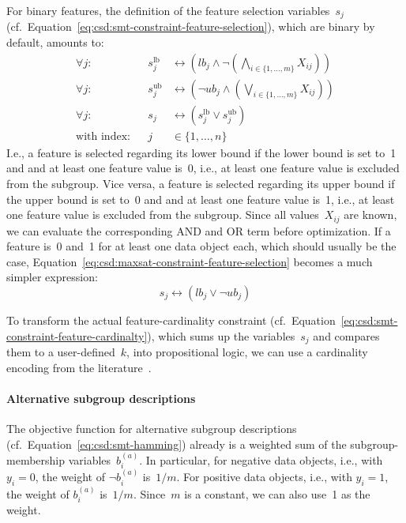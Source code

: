 \documentclass{article}
\theoremstyle{definition}
\begin{document}
For binary features, the definition of the feature selection variables~$s_j$ (cf.~Equation~\ref{eq:csd:smt-constraint-feature-selection}), which are binary by default, amounts to:
%
\begin{equation}
	\begin{aligned}
		\forall j: & & s^{\text{lb}}_j &\leftrightarrow \left( \mathit{lb}_j \land \lnot \left( \bigwedge_{i \in \{1, \dots, m\}} X_{ij} \right) \right) \\
		\forall j: & &s^{\text{ub}}_j &\leftrightarrow \left( \lnot \mathit{ub}_j \land \left( \bigvee_{i \in \{1, \dots, m\}} X_{ij} \right) \right) \\
		\forall j: & & s_j &\leftrightarrow \left( s^{\text{lb}}_j \lor s^{\text{ub}}_j \right) \\
		\text{with index:} & & j &\in \{1, \dots, n\}
	\end{aligned}
	\label{eq:csd:maxsat-constraint-feature-selection}
\end{equation}
%
I.e., a feature is selected regarding its lower bound if the lower bound is set to~1 and and at least one feature value is~0, i.e., at least one feature value is excluded from the subgroup.
Vice versa, a feature is selected regarding its upper bound if the upper bound is set to~0 and and at least one feature value is~1, i.e., at least one feature value is excluded from the subgroup.
Since all values~$X_{ij}$ are known, we can evaluate the corresponding AND and OR term before optimization.
If a feature is~0 and~1 for at least one data object each, which should usually be the case, Equation~\ref{eq:csd:maxsat-constraint-feature-selection} becomes a much simpler expression:
%
\begin{equation}
		s_j \leftrightarrow \left( \mathit{lb}_j\lor \lnot \mathit{ub}_j \right)
	\label{eq:csd:maxsat-constraint-feature-selections-simplified}
\end{equation}
%

To transform the actual feature-cardinality constraint (cf.~Equation~\ref{eq:csd:smt-constraint-feature-cardinalty}), which sums up the variables~$s_j$ and compares them to a user-defined~$k$, into propositional logic, we can use a cardinality encoding from the literature~\cite{sinz2005towards}.

\paragraph{Alternative subgroup descriptions}

The objective function for alternative subgroup descriptions (cf.~Equation~\ref{eq:csd:smt-hamming}) already is a weighted sum of the subgroup-membership variables~$b_i^{(a)}$.
In particular, for negative data objects, i.e., with $y_i = 0$, the weight of $\lnot b_i^{(a)}$ is~$1 / m$.
For positive data objects, i.e., with $y_i = 1$, the weight of $b_i^{(a)}$ is~$1 / m$.
Since~$m$ is a constant, we can also use~1 as the weight.
\end{document}
